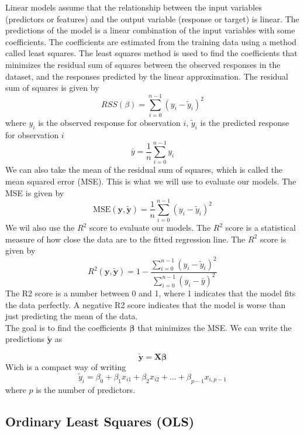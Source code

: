 \documentclass[twoside,11pt]{report}
\begin{document}
Linear models assume that the relationship between the input variables (predictors or features) 
and the output variable (response or target) is linear. The predictions of the model is a linear
combination of the input variables with some coefficients. The coefficients are estimated from
the training data using a method called least squares. The least squares method is used to find
the coefficients that minimizes the residual sum of squares between the observed responses in
the dataset, and the responses predicted by the linear approximation. The residual sum of squares
is given by
$$
RSS(\beta) = \sum_{i=0}^{n-1} (y_i - \tilde{y}_i)^2
$$
where $y_i$ is the observed response for observation $i$, $\tilde{y}_i$ is the predicted response for observation $i$ 
$$
\bar{y} =  \frac{1}{n} \sum_{i=0}^{n - 1} y_i
$$
We can also take the mean of the residual sum of squares, which is called the mean squared error (MSE). This is what we will use to
evaluate our models. The MSE is given by
$$
\mbox{MSE}(\mathbf{y},\mathbf{\tilde{y}}) = \frac{1}{n}
\sum_{i=0}^{n-1}(y_i-\tilde{y}_i)^2
$$
We wil also use the $R^2$ score to evaluate our models. The $R^2$ score is a statistical measure of how close the data are 
to the fitted regression line. The $R^2$ score is given by
$$
R^2(\mathbf{y}, \tilde{\mathbf{y}}) = 1 - \frac{\sum_{i=0}^{n - 1} (y_i - \tilde{y}_i)^2}{\sum_{i=0}^{n - 1} (y_i - \bar{y})^2}
$$
The R2 score is a number between 0 and 1, where 1 indicates that the model fits the data perfectly. 
A negative R2 score indicates that the model is worse than just predicting the mean of the data.\\
The goal is to find the coefficients $\boldsymbol{\beta}$ that minimizes the MSE. We can write the predictions $\tilde{\mathbf{y}}$ as

$$
\tilde{\mathbf{y}} = \mathbf{X}\boldsymbol{\beta}
$$
Wich is a compact way of writing
$$
\tilde{y}_i = \beta_0 + \beta_1 x_{i1} + \beta_2 x_{i2} + \dots + \beta_{p-1} x_{i,p-1}
$$
where $p$ is the number of predictors.\\





\subsection{Ordinary Least Squares (OLS)}
\label{sec:ols}
\end{document}

